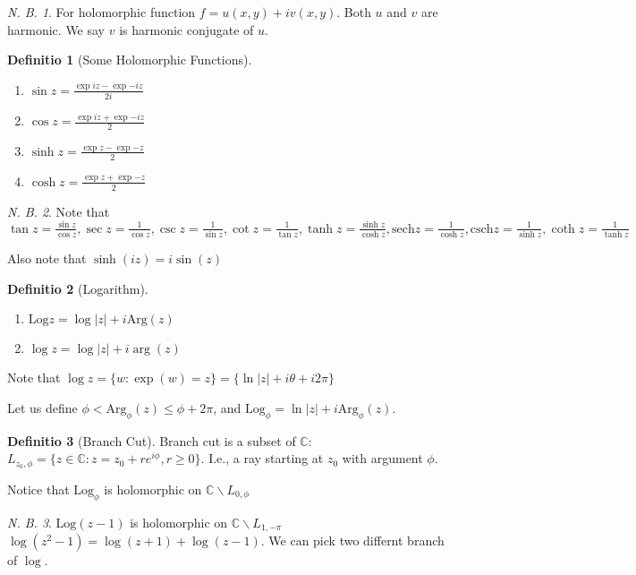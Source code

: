 \documentclass[12pt, a4paper]{article}
\theoremstyle{definition}
\newtheorem{definition}{Definitio}[section]
\theoremstyle{remark}
\newtheorem{note}{N. B.}[section]
\newcommand{\bb}[1]{\mathbb{#1}}
\newcommand{\Arg}{\text{Arg}}
\newcommand{\Log}{\text{Log}}
\newcommand{\sech}{\text{sech}}
\newcommand{\csch}{\text{csch}}
\begin{document}
\begin{note}
	For holomorphic function $f = u(x,y) + iv(x,y)$. Both $u$ and $v$ are harmonic. We say $v$ is harmonic conjugate of $u$.
\end{note}

\begin{definition}[Some Holomorphic Functions]
	\ 
	\begin{enumerate}
	\item $\sin z = \frac{\exp{iz} - \exp{-iz}}{2i}$
		\item $\cos z = \frac{\exp{iz} + \exp{-iz}}{2}$
		\item $\sinh z = \frac{\exp{z} - \exp{-z}}{2}$
		\item $\cosh z = \frac{\exp{z} + \exp{-z}}{2}$
	\end{enumerate}
\end{definition}

\begin{note}
	Note that $\tan z = \frac{\sin z}{\cos z}, \sec z = \frac{1}{\cos z}, \csc z = \frac{1}{\sin z}, \cot z = \frac{1}{\tan z}, \tanh z = \frac{\sinh z}{\cosh z}, \sech z = \frac{1}{\cosh z}, \csch z = \frac{1}{\sinh z}, \coth z = \frac{1}{\tanh z}$
	
	Also note that $\sinh(iz) = i\sin(z)$
\end{note}

\begin{definition}[Logarithm]
	\ 
	\begin{enumerate}
		\item $\Log z = \log |z| + i\Arg(z)$
		\item $\log z = \log |z| + i\arg(z)$
	\end{enumerate}
	Note that $\log z = \{w: \exp(w) = z\} = \{\ln|z| + i\theta + i 2\pi\}$

	Let us define $\phi <\Arg_{\phi}(z) \leq \phi + 2\pi$, and $\Log_{\phi} = \ln |z| + i \Arg_{\phi}(z)$.
\end{definition}

\begin{definition}[Branch Cut]
	Branch cut is a subset of $\bb{C}$: $L_{z_0, \phi} = \{z \in \bb{C}: z = z_0 + re^{i \phi}, r \geq 0\}$. I.e., a ray starting at $z_0$ with argument $\phi$.
\end{definition}


Notice that $\Log_{\phi}$ is holomorphic on $\bb{C} \backslash L_{0, \phi} $

\begin{note} 
	$\Log(z-1)$ is holomorphic on $\bb{C} \backslash L_{1, -\pi}$
	$\log(z^2 - 1) = \log(z+1) + \log(z-1)$. We can pick two differnt branch of $\log$.
\end{note}
\end{document}
